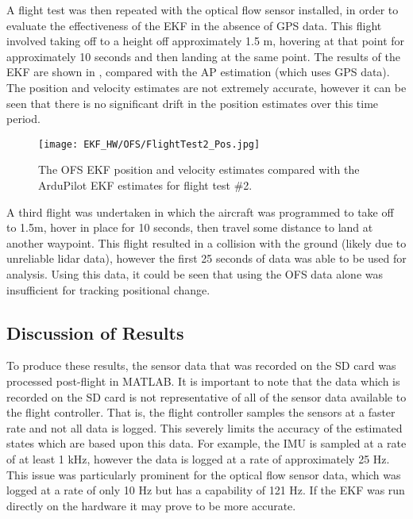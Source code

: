 A flight test was then repeated with the optical flow sensor installed, in order to evaluate the effectiveness of the EKF in the absence of GPS data. This flight involved taking off to a height off approximately 1.5 m, hovering at that point for approximately 10 seconds and then landing at the same point. The results of the EKF are shown in , compared with the AP estimation (which uses GPS data). The position and velocity estimates are not extremely accurate, however it can be seen that there is no significant drift in the position estimates over this time period.

\begin{figure}[htb]
	\texttt{[image: EKF\_HW/OFS/FlightTest2\_Pos.jpg]}%
	\caption{The OFS EKF position and velocity estimates compared with the ArduPilot EKF estimates for flight test \#2.}%
	\label{fig:HW_OFS_Pos}%
\end{figure}

A third flight was undertaken in which the aircraft was programmed to take off to 1.5m, hover in place for 10 seconds, then travel some distance to land at another waypoint. This flight resulted in a collision with the ground (likely due to unreliable lidar data), however the first 25 seconds of data was able to be used for analysis. Using this data, it could be seen that using the OFS data alone was insufficient for tracking positional change. 

\FloatBarrier
\subsection{Discussion of Results}
To produce these results, the sensor data that was recorded on the SD card was processed post-flight in MATLAB. It is important to note that the data which is recorded on the SD card is not representative of all of the sensor data available to the flight controller. That is, the flight controller samples the sensors at a faster rate and not all data is logged. This severely limits the accuracy of the estimated states which are based upon this data. For example, the IMU is sampled at a rate of at least 1 kHz, however the data is logged at a rate of approximately 25 Hz. This issue was particularly prominent for the optical flow sensor data, which was logged at a rate of only 10 Hz but has a capability of 121 Hz. If the EKF was run directly on the hardware it may prove to be more accurate. \\

